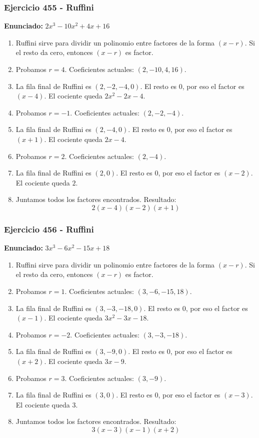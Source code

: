 \documentclass[11pt,a4paper]{article}
\begin{document}
\subsubsection*{Ejercicio 455 - Ruffini}
\textbf{Enunciado:} $ 2 x^{3} - 10 x^{2} + 4 x + 16 $\par
\begin{enumerate}[leftmargin=2em]
\item Ruffini sirve para dividir un polinomio entre factores de la forma \((x-r)\). Si el resto da cero, entonces \((x-r)\) es factor.
\item Probamos \(r=4\). Coeficientes actuales: \((2, -10, 4, 16)\).
\item La fila final de Ruffini es \((2, -2, -4, 0)\). El resto es \(0\), por eso el factor es \((x-4)\). El cociente queda \(2 x^{2} - 2 x - 4\).
\item Probamos \(r=-1\). Coeficientes actuales: \((2, -2, -4)\).
\item La fila final de Ruffini es \((2, -4, 0)\). El resto es \(0\), por eso el factor es \((x+1)\). El cociente queda \(2 x - 4\).
\item Probamos \(r=2\). Coeficientes actuales: \((2, -4)\).
\item La fila final de Ruffini es \((2, 0)\). El resto es \(0\), por eso el factor es \((x-2)\). El cociente queda \(2\).
\item Juntamos todos los factores encontrados. Resultado: \[\boxed{2 \left(x - 4\right) \left(x - 2\right) \left(x + 1\right)}\]
\end{enumerate}

\vspace{0.2cm}
\subsubsection*{Ejercicio 456 - Ruffini}
\textbf{Enunciado:} $ 3 x^{3} - 6 x^{2} - 15 x + 18 $\par
\begin{enumerate}[leftmargin=2em]
\item Ruffini sirve para dividir un polinomio entre factores de la forma \((x-r)\). Si el resto da cero, entonces \((x-r)\) es factor.
\item Probamos \(r=1\). Coeficientes actuales: \((3, -6, -15, 18)\).
\item La fila final de Ruffini es \((3, -3, -18, 0)\). El resto es \(0\), por eso el factor es \((x-1)\). El cociente queda \(3 x^{2} - 3 x - 18\).
\item Probamos \(r=-2\). Coeficientes actuales: \((3, -3, -18)\).
\item La fila final de Ruffini es \((3, -9, 0)\). El resto es \(0\), por eso el factor es \((x+2)\). El cociente queda \(3 x - 9\).
\item Probamos \(r=3\). Coeficientes actuales: \((3, -9)\).
\item La fila final de Ruffini es \((3, 0)\). El resto es \(0\), por eso el factor es \((x-3)\). El cociente queda \(3\).
\item Juntamos todos los factores encontrados. Resultado: \[\boxed{3 \left(x - 3\right) \left(x - 1\right) \left(x + 2\right)}\]
\end{enumerate}
\end{document}
